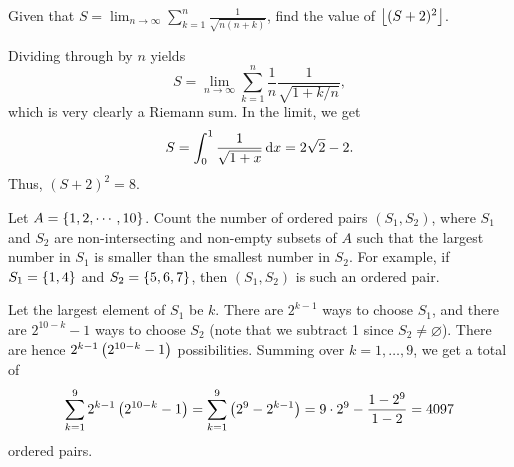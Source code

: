 \begin{question}[8]\label{Q::2020-O-1-10}
    Given that $S = \displaystyle\lim_{n \to \infty} \sum_{k=1}^n \frac{1}{\sqrt{n(n+k)}}$, find the value of $\left\lfloor (S+2)^2 \right\rfloor$.
\end{question}
\begin{solution*}
    Dividing through by $n$ yields \[S = \lim_{n \to \infty} \sum_{k=1}^n \frac1{n} \frac{1}{\sqrt{1 + k/n}},\] which is very clearly a Riemann sum. In the limit, we get \[S = \int_0^1 \frac1{\sqrt{1 + x}} \mathop{\mathrm{d}x} = 2\sqrt2 - 2.\] Thus, $(S + 2)^2 = 8$.
\end{solution*}

\begin{question}[4097]\label{Q::2020-O-1-11}
    Let $A = \left\lbrace 1, 2, \cdots, 10 \right\rbrace$. Count the number of ordered pairs $(S_1, S_2)$, where $S_1$ and $S_2$ are non-intersecting and non-empty subsets of $A$ such that the largest number in $S_1$ is smaller than the smallest number in $S_2$. For example, if $S_1 = \left\lbrace 1, 4 \right\rbrace$ and $S_2 = \left\lbrace 5, 6, 7 \right\rbrace$, then $(S_1, S_2)$ is such an ordered pair.
\end{question}
\begin{solution*}
    Let the largest element of $S_1$ be $k$. There are $2^{k-1}$ ways to choose $S_1$, and there are $2^{10-k} - 1$ ways to choose $S_2$ (note that we subtract 1 since $S_2 \neq \varnothing$). There are hence $2^{k-1} \left( 2^{10-k} - 1 \right)$ possibilities. Summing over $k = 1, \ldots, 9$, we get a total of \[\sum_{k=1}^9 2^{k-1} \left( 2^{10-k} - 1 \right) = \sum_{k=1}^9 \left( 2^9 - 2^{k-1} \right) = 9 \cdot 2^9 - \frac{1-2^9}{1-2} = 4097\] ordered pairs.
\end{solution*}

